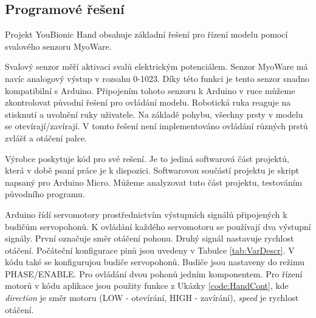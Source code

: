 \documentclass[thesis=B,czech]{FITthesis}[2012/06/26]
\begin{document}
\subsection{Programové řešení}
\label{subsec:progRes}


Projekt YouBionic Hand obsahuje základní řešení pro řízení modelu pomocí svalového senzoru MyoWare.


Svalový senzor měří aktivaci svalů elektrickým potenciálem. Senzor MyoWare má navíc analogový výstup v rozsahu 0-1023\cite{MusSensDoc}. Díky této funkci je tento senzor snadno kompatibilní s Arduino. Připojením tohoto senzoru k Arduino v ruce můžeme zkontrolovat původní řešení pro ovládání modelu. Robotická ruka reaguje na stisknutí a uvolnění ruky uživatele. Na základě pohybu, všechny prsty v modelu se otevírají/zavírají. V tomto řešení není implementováno ovládání různých prstů zvlášť a otáčení palce.


Výrobce poskytuje kód pro své rešení. Je to jediná softwarová část projektů, která v době psaní práce je k dispozici. Softwarovou součástí projektu je skript napsaný pro Arduino Micro. Můžeme analyzovat tuto část projektu, testováním původního programu.


Arduino řídí servomotory prostřednictvím výstupních signálů připojených k budičům servopohonů. K ovládání každého servomotoru se používají dva výstupní signály. První označuje směr otáčení pohonu. Druhý signál nastavuje rychlost otáčení. Počáteční konfigurace pinů jsou uvedeny v Tabulce \ref{tab:VarDescr}. V kódu také se konfigurujou budiče servopohonů. Budiče jsou nastaveny do režimu PHASE/ENABLE. Pro ovládání dvou pohonů jedním komponentem. Pro řízení motorů v kódu aplikace jsou použity funkce z Ukázky \ref{code:HandCont}, kde \textit{direction} je směr motoru (LOW - otevírání, HIGH - zavírání), \textit{speed} je rychlost otáčení.
\end{document}
